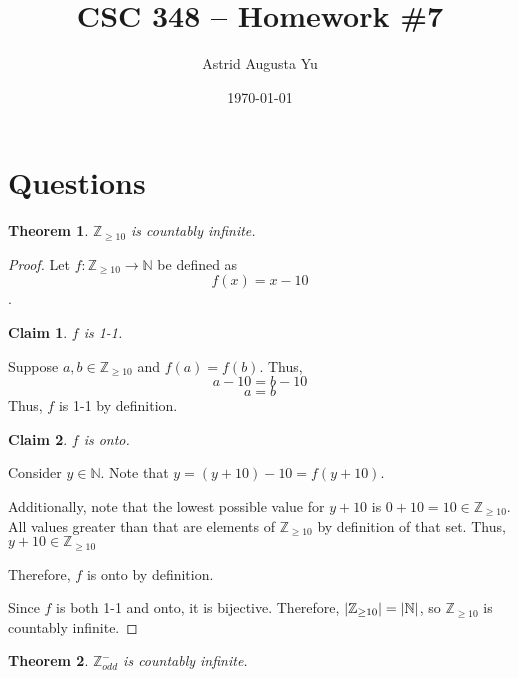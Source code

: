 \documentclass{article}
\author{Astrid Augusta Yu}
\title{CSC 348 -- Homework \#7}
\date{\today}
\DeclarePairedDelimiter\abs{\lvert}{\rvert}%
\newtheorem{theorem}{Theorem}
\newtheorem{claim}{Claim}[theorem]
\begin{document}
\maketitle
\tableofcontents

\section{Questions}
\begin{outline}[enumerate]
    \1 \begin{theorem}
        $\mathbb{Z}_{\geq 10}$ is countably infinite.
    \end{theorem}
    \begin{proof}
        Let $f: \mathbb{Z}_{\geq 10} \rightarrow \mathbb{N}$ be defined as 
        $$f(x) = x - 10$$.
        \begin{claim}
            $f$ is 1-1.
        \end{claim}
        \begin{adjustwidth}{.5cm}{.5cm}
            Suppose $a, b \in \mathbb{Z}_{\geq 10}$ and $f(a) = f(b)$. Thus,
            $$a - 10 = b - 10$$
            $$a = b$$
            Thus, $f$ is 1-1 by definition.
        \end{adjustwidth}
        \begin{claim}
            $f$ is onto.
        \end{claim}
        \begin{adjustwidth}{.5cm}{.5cm}
            Consider $y \in \mathbb{N}$. Note that $y = (y + 10) - 10 = f(y + 10)$.

            Additionally, note that the lowest possible value for $y + 10$ is $0 + 10 = 10 \in \mathbb{Z}_{\geq 10}$. All values greater than that are elements of $\mathbb{Z}_{\geq 10}$ by definition of that set. Thus, $y + 10 \in \mathbb{Z}_{\geq 10}$
            
            Therefore, $f$ is onto by definition.
        \end{adjustwidth}

        Since $f$ is both 1-1 and onto, it is bijective. Therefore, $\abs{\mathbb{Z}_{\geq 10}} = \abs{\mathbb{N}}$, so $\mathbb{Z}_{\geq 10}$ is countably infinite.
    \end{proof}

    \1 \begin{theorem}
        $\mathbb{Z}^-_{odd}$ is countably infinite.
    \end{theorem}
    

\end{outline}
\end{document}
